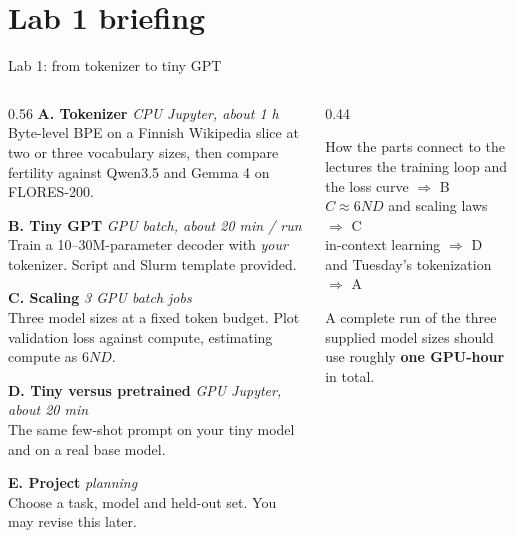 \documentclass[aspectratio=169,10pt]{beamer}
\begin{document}
\section{Lab 1 briefing}

\begin{frame}[shrink=12]{Lab 1: from tokenizer to tiny GPT}
  \begin{columns}[T]
    \begin{column}{0.56\textwidth}
      \textbf{A. Tokenizer} \hfill \textit{CPU Jupyter, about 1 h}\\
      Byte-level BPE on a Finnish Wikipedia slice at two or three vocabulary
      sizes, then compare fertility against Qwen3.5 and Gemma 4 on FLORES-200.
      \vspace{0.3em}

      \textbf{B. Tiny GPT} \hfill \textit{GPU batch, about 20 min / run}\\
      Train a 10--30M-parameter decoder with \emph{your} tokenizer. Script and
      Slurm template provided.
      \vspace{0.3em}

      \textbf{C. Scaling} \hfill \textit{3 GPU batch jobs}\\
      Three model sizes at a fixed token budget. Plot validation loss against
      compute, estimating compute as $6ND$.
      \vspace{0.3em}

      \textbf{D. Tiny versus pretrained} \hfill \textit{GPU Jupyter, about 20 min}\\
      The same few-shot prompt on your tiny model and on a real base model.
      \vspace{0.3em}

      \textbf{E. Project} \hfill \textit{planning}\\
      Choose a task, model and held-out set. You may revise this later.
    \end{column}
    \begin{column}{0.44\textwidth}
      \begin{block}{How the parts connect to the lectures}
        \small
        the training loop and the loss curve $\Rightarrow$ B\\[0.25em]
        $C \approx 6ND$ and scaling laws $\Rightarrow$ C\\[0.25em]
        in-context learning $\Rightarrow$ D\\[0.25em]
        and Tuesday's tokenization $\Rightarrow$ A
      \end{block}
      \vspace{0.3em}
      \small
      A complete run of the three supplied model sizes should use roughly
      \textbf{one GPU-hour} in total.
      \vspace{0.5em}


\end{column}
\end{columns}
\end{frame}
\end{document}
